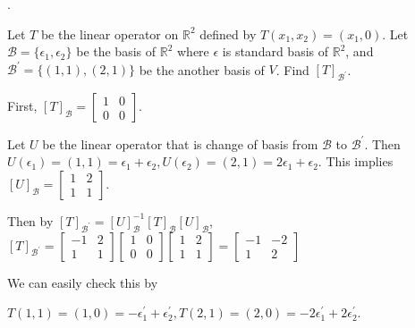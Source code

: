 \documentclass[8pt]{beamer}
\newcommand{\mbb}[1]{\mathbb{#1}}
\newcommand{\mc}[1]{\mathcal{#1}}
\begin{document}
\begin{frame}{.}
    \begin{example}
        Let $T$ be the linear operator on $\mbb{R}^2$ defined by $T(x_1, x_2) = (x_1, 0)$. Let $\mc{B} = \{\epsilon_1, \epsilon_2\}$ be the basis of $\mbb{R}^2$ where $\epsilon$ is standard basis of $\mbb{R}^2$, and $\mc{B}^\prime = \{(1,1), (2,1)\}$ be the another basis of $V$. Find $[T]_{\mc{B}^\prime}$.
    \end{example}

    First, $[T]_{\mc{B}} = \left[\begin{matrix}
        1 & 0 \\ 0 & 0
    \end{matrix}\right]$.

    Let $U$ be the linear operator that is change of basis from $\mc{B}$ to $\mc{B}^\prime$. Then $U(\epsilon_1) = (1,1) = \epsilon_1 + \epsilon_2, U(\epsilon_2) = (2,1) = 2 \epsilon_1 + \epsilon_2$. This implies $[U]_{\mc{B}} = \left[\begin{matrix}
    1 & 2 \\ 1 & 1
    \end{matrix}\right]$.

    Then by $[T]_{\mc{B}^\prime} = [U]_{\mc{B}}^{-1}[T]_{\mc{B}}[U]_{\mc{B}}$, $[T]_{\mc{B}^\prime} = \left[\begin{matrix}
    -1 & 2 \\ 1 & 1
    \end{matrix}\right]\left[ \begin{matrix}1 & 0 \\ 0 & 0\end{matrix}\right]\left[\begin{matrix}
    1 & 2\\ 1 & 1
    \end{matrix}\right] = \left[\begin{matrix}
        -1 & -2 \\ 1 & 2
    \end{matrix}\right]$ 

    We can easily check this by

    $T(1, 1) = (1, 0) = - \epsilon_1^\prime + \epsilon_2^\prime, T(2, 1) = (2, 0) = -2 \epsilon_1^\prime + 2 \epsilon_2^\prime$.
\end{frame}
\end{document}
